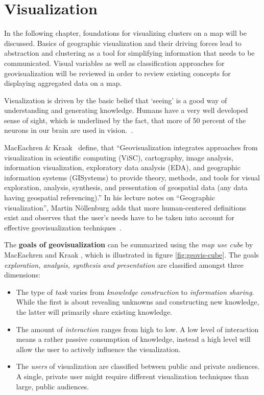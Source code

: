 
%
%

\section{Visualization}

In the following chapter, foundations for visualizing clusters on a map will be discussed. Basics of geographic visualization and their driving forces lead to abstraction and clustering as a tool for simplifying information that needs to be communicated. Visual variables as well as classification approaches for geovisualization will be reviewed in order to review existing concepts for displaying aggregated data on a map.

Visualization is driven by the basic belief that `seeing' is a good way of understanding and generating knowledge. Humans have a very well developed sense of sight, which is underlined by the fact, that more of 50 percent of the neurons in our brain are used in vision.~\cite{vislecture}. 

MacEachren \& Kraak~\cite{maceachren-geovis} define, that ``Geovisualization integrates approaches from visualization in scientific computing (ViSC), cartography, image analysis, information visualization, exploratory data analysis (EDA), and geographic information systems (GISystems) to provide theory, methods, and tools for visual exploration, analysis, synthesis, and presentation of geospatial data (any data having geospatial referencing).'' In his lecture notes on ``Geographic visualization'', Martin N\"{o}llenburg adds that more human-centered definitions exist and observes that the user's needs have to be taken into account for effective geovisualization techniques~\cite{noellenburg11geovis}.


The \textbf{goals of geovisualization} can be summarized using the \textit{map use cube} by MacEachren and Kraak \cite{MacEachren07cartovis}, which is illustrated in figure \ref{fig:geovis-cube}. The goals \textit{exploration, analysis, synthesis and presentation} are classified amongst three dimensions:

\begin{itemize}

\item The type of \textit{task} varies from \textit{knowledge construction} to \textit{information sharing}. While the first is about revealing unknowns and constructing new knowledge, the latter will primarily share existing knowledge.

\item The amount of \textit{interaction} ranges from high to low. A low level of interaction means a rather passive consumption of knowledge, instead a high level will allow the user to actively influence the visualization.

\item The \textit{users} of visualization are classified between public and private audiences. A single, private user might require different visualization techniques than large, public audiences.

\end{itemize}

